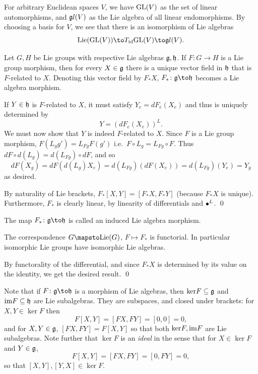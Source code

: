 \eproof

For arbitrary Euclidean spaces $V$, we have ${\rm GL}(V)$ as the set of linear automorphisms, and ${\frak gl}(V)$ as the Lie algebra of all linear
endomorphisms.
By choosing a basis for $V$, we see that there is an isomorphism of Lie algebras
$$ \lie(\gl(V)) \to T_{\id}\gl(V) \to \lgl(V) . $$

\bthrm

    Let $G,H$ be Lie groups with respective Lie algebras ${{\frak g}},{{\frak h}}$.
    If $F\colon G\to H$ is a Lie group morphism, then for every $X\in{{\frak g}}$ there is a unique vector field in ${{\frak h}}$ that is $F$-related to $X$.
    Denoting this vector field by $F_*X$, $F_*\colon\g\to\h$ becomes a Lie algebra morphism.

\ethrm

\bproof

    If $Y\in{{\frak h}}$ is $F$-related to $X$, it must satisfy $Y_e=dF_e(X_e)$ and thus is uniquely determined by
    $$ Y = (dF_e(X_e))^L . $$
    We must now show that $Y$ is indeed $F$-related to $X$.
    Since $F$ is a Lie group morphism, $F(L_gg')=L_{Fg}F(g')$ i.e.\ $F\circ L_g=L_{Fg}\circ F$.
    Thus $dF\circ d(L_g)=d(L_{Fg})\circ dF$, and so
    $$ dF(X_g) = dF(d(L_g)X_e) = d(L_{Fg})(dF(X_e)) = d(L_{Fg})(Y_e) = Y_g $$
    as desired.

    By naturality of Lie brackets, $F_*[X,Y]=[F_*X,F_*Y]$ (because $F_*X$ is unique).
    Furthermore, $F_*$ is clearly linear, by linearity of differentials and $\bullet^L$.
    \qed

\eproof

The map $F_*\colon\g\to\h$ is called an {\emphcolor induced Lie algebra morphism}.

\bprop

    The correspondence $G\mapsto\lie(G)$, $F\mapsto F_*$ is functorial.
    In particular isomorphic Lie groups have isomorphic Lie algebras.

\eprop

\bproof

    By functorality of the differential, and since $F_*X$ is determined by its value on the identity, we get the desired result.
    \qed

\eproof

Note that if $F\colon\g\to\h$ is a morphism of Lie algebras, then ${\rm ker} F\subseteq{{\frak g}}$ and ${\rm im} F\subseteq{{\frak h}}$ are Lie subalgebras.
They are subspaces, and closed under brackets: for $X,Y\in\ker F$ then
$$ F[X,Y] = [FX,FY] = [0,0] = 0 , $$
and for $X,Y\in{{\frak g}}$, $[FX,FY]=F[X,Y]$ so that both ${\rm ker} F,{\rm im} F$ are Lie subalgebras.
Note further that $\ker F$ is an {\it ideal\/} in the sense that for $X\in\ker F$ and $Y\in{{\frak g}}$,
$$ F[X,Y] = [FX,FY] = [0,FY] = 0 , $$
so that $[X,Y],[Y,X]\in\ker F$.

